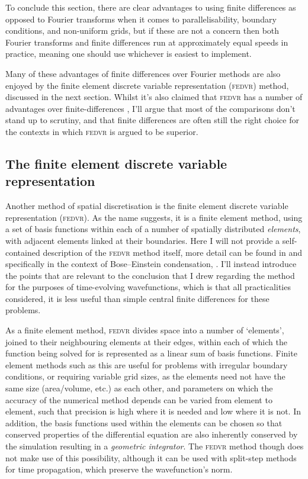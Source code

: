 To conclude this section, there are clear advantages to using finite differences as opposed to Fourier transforms when it comes to parallelisability, boundary conditions, and non-uniform grids, but if these are not a concern then both Fourier transforms and finite differences run at approximately equal speeds in practice, meaning one should use whichever is easiest to implement.

Many of these advantages of finite differences over Fourier methods are also enjoyed by the finite element discrete variable representation (\textsc{fedvr}) method, discussed in the next section. Whilst it's also claimed that \textsc{fedvr} has a number of advantages over finite-differences \cite{schneider_discrete_2005,schneider_parallel_2006}, I'll argue that most of the comparisons don't stand up to scrutiny, and that finite differences are often still the right choice for the contexts in which \textsc{fedvr} is argued to be superior.

\subsection{The finite element discrete variable representation}

Another method of spatial discretisation is the finite element discrete variable representation (\textsc{fedvr}). As the name suggests, it is a finite element method, using a set of basis functions within each of a number of spatially distributed \emph{elements}, with adjacent elements linked at their boundaries. Here I will not provide a self-contained description of the \textsc{fedvr} method itself, more detail can be found in \cite[p.~285]{tannor_introduction_2007} and specifically in the context of Bose--Einstein condensation, \cite{schneider_discrete_2005,schneider_parallel_2006}. I'll instead introduce the points that are relevant to the conclusion that I drew regarding the method for the purposes of time-evolving wavefunctions, which is that all practicalities considered, it is less useful than simple central finite differences for these problems.

As a finite element method, \textsc{fedvr} divides space into a number of `elements', joined to their neighbouring elements at their edges, within each of which the function being solved for is represented as a linear sum of basis functions. Finite element methods such as this are useful for problems with irregular boundary conditions, or requiring variable grid sizes, as the elements need not have the same size (area/volume, etc.) as each other, and parameters on which the accuracy of the numerical method depends can be varied from element to element, such that precision is high where it is needed and low where it is not. In addition, the basis functions used within the elements can be chosen so that conserved properties of the differential equation are also inherently conserved by the simulation resulting in a \emph{geometric integrator}. The \textsc{fedvr} method though does not make use of this possibility, although it can be used with split-step methods for time propagation, which preserve the wavefunction's norm.

